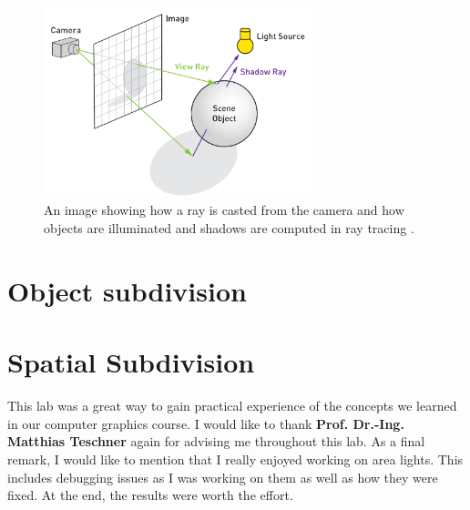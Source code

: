 \documentclass[11pt,a4paper]{article}
\begin{document}
			\begin{figure}[H]


				
		\begin{center}
			\includegraphics[width=0.7\textwidth]{4.png}
			
					\caption{ An image showing how a ray is casted from the camera and how objects are illuminated and shadows are computed in ray tracing	.} %
			\label{fig:1}
		\end{center}
	\end{figure}


	\section{Object subdivision}
	\section{Spatial Subdivision}
	
	This lab was a great way to gain practical experience of the concepts we learned in our computer graphics course. I would like to thank \textbf{Prof. Dr.-Ing. Matthias Teschner} again for advising me throughout this lab. As a final remark, I would like to mention that I really enjoyed working on area lights. This includes debugging issues as I was working on them as well as how they were fixed. At the end, the results were worth the effort.
	
	
	
	
\end{document}
